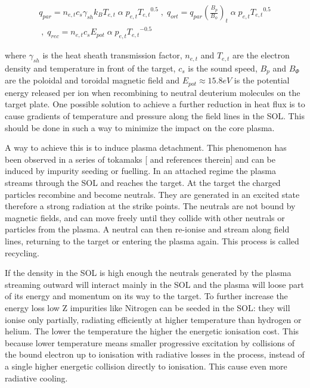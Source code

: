 \begin{equation}
\begin{split}
{ q } _{ par } = { n } _{ e,t } { c } _{ s } {  \gamma  } _{ sh }{ k } _{ B }{ T } _{ e,t } \; \alpha \; { p } _{ e,t }{{ T } _{ e,t }}^{0.5 }  \;,\; { q } _{ ort } = { q } _{ par } \left( \frac {{ B } _{ p }} {{  B  }_{ \phi  }}   \right) _{ t} \; \alpha \; { p } _{ e,t }{{ T } _{ e,t }}^{0.5 } \\ \;,\; { q } _{ rec } = { n } _{ e,t } { c } _{ s } {  E  } _{ pot } \; \alpha \; { p } _{ e,t }{{ T } _{ e,t }}^{-0.5 }
\end{split}
\label{eq:detachment}
\end{equation}

where $\gamma_{sh}$ is the heat sheath transmission factor, $n_{e,t}$ and $T_{e,t}$ are the electron density and temperature in front of the target, $c_s$ is the sound speed, $B_p$ and $B_{\Phi}$ are the poloidal and toroidal magnetic field and $E_{pot} \approx 15.8 eV$ is the potential energy released per ion when recombining to neutral deuterium molecules on the target plate. \cite{Reimold2015} One possible solution to achieve a further reduction in heat flux is to cause gradients of temperature and pressure along the field lines in the SOL. This should be done in such a way to minimize the impact on the core plasma.

A way to achieve this is to induce plasma detachment. This phenomenon has been observed in a series of tokamaks [\cite{Reimold2015} and references therein] and can be induced by impurity seeding or fuelling.
In an attached regime the plasma streams through the SOL and reaches the target. At the target the charged particles recombine and become neutrals. They are generated in an excited state therefore a strong radiation at the strike points. The neutrals are not bound by magnetic fields, and can move freely until they collide with other neutrals or particles from the plasma. A neutral can then re-ionise and stream along field lines, returning to the target or entering the plasma again. This process is called recycling.

If the density in the SOL is high enough the neutrals generated by the plasma streaming outward will interact mainly in the SOL and the plasma will loose part of its energy and momentum on its way to the target. To further increase the energy loss low Z impurities like Nitrogen can be seeded in the SOL: they will ionise only partially, radiating efficiently at higher temperature than hydrogen or helium. The lower the temperature the higher the energetic ionisation cost. This because lower temperature means smaller progressive excitation by collisions of the bound electron up to ionisation with radiative losses in the process, instead of a single higher energetic collision directly to ionisation. This cause even more radiative cooling. 

